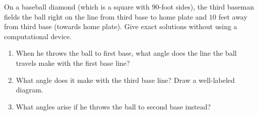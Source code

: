\documentclass{ximera}
\author{Elizabeth Campolongo}
\begin{document}
\begin{exercise}
On a baseball diamond (which is a square with $90$-foot sides), the third baseman fields the ball right on the line from third base to home plate and $10$ feet away from third base (towards home plate).  
Give exact solutions without using a computational device.%
%
\begin{enumerate}
\item When he throws the ball to first base, what angle does the line the ball travels make with the first base line? 

\item What angle does it make with the third base line? Draw a well-labeled diagram.%
%
\item What angles arise if he throws the ball to second base instead?
%
\end{enumerate}
\end{exercise}
\end{document}
